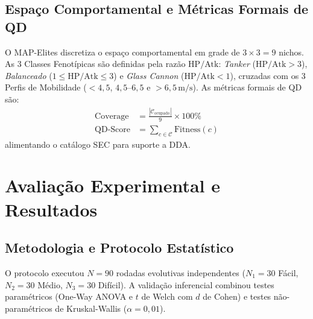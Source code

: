 \documentclass[10pt,conference,twocolumn]{article}
\begin{document}
\begin{table}[h]
\centering
\caption{Matriz de Coeficientes da Função de Fitness}
\label{tab:pesos_fitness}
\end{table}

\subsection{Espaço Comportamental e Métricas Formais de QD}
O MAP-Elites \cite{mouret2015illuminating} discretiza o espaço comportamental em grade de $3 \times 3 = 9$ nichos. As 3 Classes Fenotípicas são definidas pela razão $\text{HP}/\text{Atk}$: \textit{Tanker} ($\text{HP}/\text{Atk} > 3$), \textit{Balanceado} ($1 \le \text{HP}/\text{Atk} \le 3$) e \textit{Glass Cannon} ($\text{HP}/\text{Atk} < 1$), cruzadas com os 3 Perfis de Mobilidade ($< 4{,}5$, $4{,}5\text{--}6{,}5$ e $> 6{,}5\,\text{m/s}$). As métricas formais de QD \cite{kirk2020exploring} são:
\begin{align}
\text{Coverage} &= \frac{|\mathcal{C}_{\text{ocupado}}|}{9} \times 100\% \label{eq:coverage} \\
\text{QD-Score} &= \sum_{c \in \mathcal{C}} \text{Fitness}(c) \label{eq:qd_score}
\end{align}
alimentando o catálogo SEC \cite{glavin2015skilled} para suporte a DDA.

\section{Avaliação Experimental e Resultados}
\label{sec:resultados}

\subsection{Metodologia e Protocolo Estatístico}
O protocolo executou $N = 90$ rodadas evolutivas independentes ($N_1 = 30$ Fácil, $N_2 = 30$ Médio, $N_3 = 30$ Difícil). A validação inferencial combinou testes paramétricos (One-Way ANOVA e $t$ de Welch com $d$ de Cohen) e testes não-paramétricos de Kruskal-Wallis ($\alpha = 0{,}01$).
\end{document}
